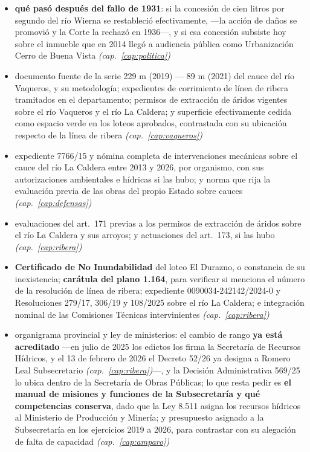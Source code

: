 \begin{itemize}[leftmargin=*]
\item \textbf{qué pasó después del fallo de 1931}: si la concesión de cien litros por segundo del río Wierna se restableció efectivamente, ---la acción de daños se promovió y la Corte la rechazó en 1936---, y si esa concesión subsiste hoy sobre el inmueble que en 2014 llegó a audiencia pública como Urbanización Cerro de Buena Vista \textit{(cap.\ \ref{cap:politica})}
\item documento fuente de la serie 229 m (2019) --- 89 m (2021) del cauce del río Vaqueros, y su metodología; expedientes de corrimiento de línea de ribera tramitados en el departamento; permisos de extracción de áridos vigentes sobre el río Vaqueros y el río La Caldera; y superficie efectivamente cedida como espacio verde en los loteos aprobados, contrastada con su ubicación respecto de la línea de ribera \textit{(cap.\ \ref{cap:vaqueros})}
\item expediente 7766/15 y nómina completa de intervenciones mecánicas sobre el cauce del río La Caldera entre 2013 y 2026, por organismo, con sus autorizaciones ambientales e hídricas si las hubo; y norma que rija la evaluación previa de las obras del propio Estado sobre cauces \textit{(cap.\ \ref{cap:defensas})}
\item evaluaciones del art.\ 171 previas a los permisos de extracción de áridos sobre el río La Caldera y sus arroyos; y actuaciones del art.\ 173, si las hubo \textit{(cap.\ \ref{cap:ribera})}
\item \textbf{Certificado de No Inundabilidad} del loteo El Durazno, o constancia de su inexistencia; \textbf{carátula del plano 1.164}, para verificar si menciona el número de la resolución de línea de ribera; expediente 0090034-242142/2024-0 y Resoluciones 279/17, 306/19 y 108/2025 sobre el río La Caldera; e integración nominal de las Comisiones Técnicas intervinientes \textit{(cap.\ \ref{cap:ribera})}
\item organigrama provincial y ley de ministerios: el cambio de rango \textbf{ya está acreditado} ---en julio de 2025 los edictos los firma la Secretaría de Recursos Hídricos, y el 13 de febrero de 2026 el Decreto 52/26 ya designa a Romero Leal Subsecretario \textit{(cap.\ \ref{cap:ribera})}---, y la Decisión Administrativa 569/25 lo ubica dentro de la Secretaría de Obras Públicas; lo que resta pedir es \textbf{el manual de misiones y funciones de la Subsecretaría y qué competencias conserva}, dado que la Ley 8.511 asigna los recursos hídricos al Ministerio de Producción y Minería; y presupuesto asignado a la Subsecretaría en los ejercicios 2019 a 2026, para contrastar con su alegación de falta de capacidad \textit{(cap.\ \ref{cap:amparo})}

\end{itemize}
